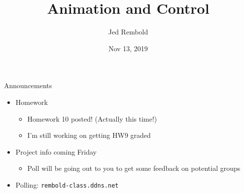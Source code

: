 \documentclass[pdf, aspectratio=169, 12pt]{beamer}
\title{Animation and Control}
\author{Jed Rembold}
\date{Nov 13, 2019}
\begin{document}
\begin{frame}{Announcements}
	\begin{itemize}
		\item Homework
			\begin{itemize}
				\item Homework 10 posted! (Actually this time!)
				\item I'm still working on getting HW9 graded
			\end{itemize}
		\item Project info coming Friday
			\begin{itemize}
				\item Poll will be going out to you to get some feedback on potential groups
			\end{itemize}
		\item Polling: \nolinkurl{rembold-class.ddns.net}
	\end{itemize}
\end{frame}
\end{document}
